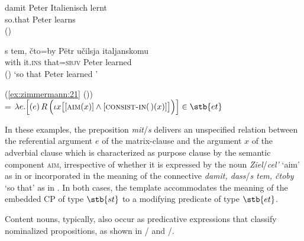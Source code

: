 \documentclass[output=paper]{langscibook}
\begin{document}
\ea\label{ex:zimmermann:25}
    \ea\gll damit Peter Italienisch lernt \label{ex:zimmermann:25a} \\
    so.that Peter  learns\\ \hfill ()

    \ex\gll s tem, čto=by Pëtr učilsja italjanskomu \label{ex:zimmermann:25b} \\
    with it.\textsc{ins} that=\textsc{sbjv} Peter learned  \\ \hfill ()
    \z
    \glt `so that Peter learned '
\z

\ea\label{ex:zimmermann:26}
\hphantom{=}  \big(\ref{ex:zimmermann:21} ()\big)\\
 = $\lambda e. \Big[(e) \, R \, \Big(\iota x \big[[\textsc{aim} (x)] \wedge [\textsc{consist-in} ($$) (x)]\big]\Big)\Big] \in \stb{et}$
\z

\noindent In these examples, the preposition \textit{mit}/\textit{s} delivers an unspecified relation between the referential argument $e$ of the matrix-clause and the argument $x$ of the adverbial clause which is characterized as purpose clause by the semantic component \textsc{aim}, irrespective of whether it is expressed by the noun \textit{Ziel}/\textit{cel'} `aim' as in  or incorporated in the meaning of the connective \textit{damit, dass}/\textit{s tem, čtoby} `so that' as in . In both cases, the template  accommodates the meaning of the embedded CP of type $\stb{st}$ to a modifying predicate of type $\stb{et}$.

Content nouns, typically, also occur as predicative expressions that classify nominalized propositions, as shown in / and /.
\end{document}
